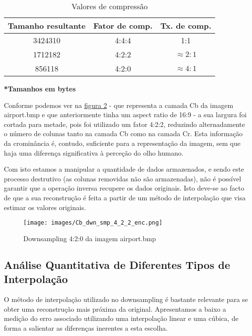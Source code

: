 \documentclass{article}
\begin{document}
\begin{table}[H]
    \centering
    \begin{tabular}{|c|c|c|}
        \hline
        Tamanho resultante & Fator de comp. & Tx. de comp. \\
        \hline
        3424310 & 4:4:4 & 1:1 \\
        \hline
        1712182 & 4:2:2 & $\approx2:1$ \\
        \hline
        856118  & 4:2:0 & $\approx4:1$ \\
        \hline
    \end{tabular}
    \caption{Valores de compressão}
    \label{tab:tabela2}
\end{table}

\hspace{28mm}\textbf{*Tamanhos em bytes}
\vspace{20mm}

Conforme podemos ver na \hyperref[fig:figure1]{figura 2} - que representa a camada Cb da imagem airport.bmp e que anteriormente tinha um aspect ratio de 16:9 - a sua largura foi cortada para metade, pois foi utilizado um fator 4:2:2, reduzindo alternadamente o número de colunas tanto na camada Cb como na camada Cr. Esta informação da crominância é, contudo, suficiente para a representação da imagem, sem que haja uma diferença significativa à perceção do olho humano. 

Com isto estamos a manipular a quantidade de dados armazenados, e sendo este processo destrutivo (as colunas removidas não são armazenadas), não é possível garantir que a operação inversa recupere os dados originais. Isto deve-se ao facto de que a sua reconstrução é feita a partir de um método de interpolação que visa estimar os valores originais.

\begin{figure}[ht]
    \centering
    \texttt{[image: images/Cb\_dwn\_smp\_4\_2\_2\_enc.png]}
    \caption{Downsampling 4:2:0 da imagem airport.bmp}
    \label{fig:figure1}
\end{figure}

\subsection{Análise Quantitativa de Diferentes Tipos de Interpolação}
O método de interpolação utilizado no downsampling é bastante relevante para se obter uma reconstrução mais próxima da original. Apresentamos a baixo a medição do erro associado utilizando uma interpolação linear e uma cúbica, de forma a salientar as diferenças inerentes a esta escolha.
\end{document}
